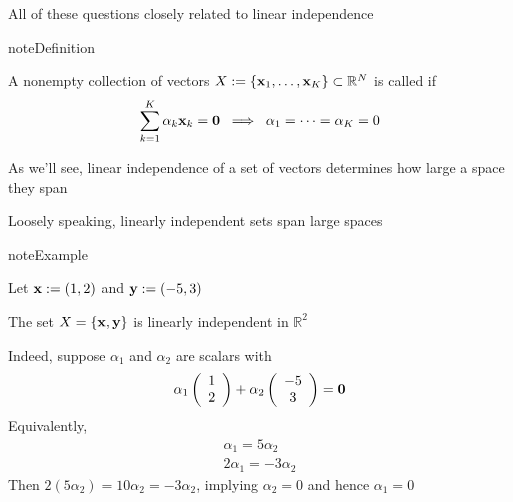 \documentclass[letterpaper,10pt,english]{jupyterBook}
\begin{document}
\sphinxAtStartPar
All of these questions closely related to linear independence

\begin{sphinxadmonition}{note}{Definition}

\sphinxAtStartPar
A nonempty collection of vectors \(X := \{{\bf x}_1,\ldots, {\bf x}_K\}
\subset \mathbb{R}^N\) is called  if
\begin{equation*}
\begin{split}
%
\sum_{k=1}^K \alpha_k {\bf x}_k
= {\bf 0} 
\; \implies \;
\alpha_1 = \cdots = \alpha_K = 0
%
\end{split}
\end{equation*}\end{sphinxadmonition}

\sphinxAtStartPar
As we’ll see, linear independence of a set of vectors determines how large
a space they span

\sphinxAtStartPar
Loosely speaking, linearly independent sets span large spaces

\begin{sphinxadmonition}{note}{Example}

\sphinxAtStartPar
Let \({\bf x} := (1, 2)\) and \({\bf y} := (-5, 3)\)

\sphinxAtStartPar
The set \(X = \{{\bf x}, {\bf y}\}\) is linearly independent in \(\mathbb{R}^2\)

\sphinxAtStartPar
Indeed, suppose \(\alpha_1\) and \(\alpha_2\) are scalars with
\begin{equation*}
\begin{split}
%
\alpha_1
\left(
\begin{array}{c}
1 \\
2
\end{array}
\right)
+ 
\alpha_2
\left(
\begin{array}{c}
-5 \\
3
\end{array}
\right)
=
{\bf 0}
%
\end{split}
\end{equation*}
\sphinxAtStartPar
Equivalently,
\begin{equation*}
\begin{split}
%
\alpha_1 = 5 \alpha_2
\\
2 \alpha_1 = -3 \alpha_2
%
\end{split}
\end{equation*}
\sphinxAtStartPar
Then \(2(5\alpha_2) = 10 \alpha_2 = -3 \alpha_2\), implying \(\alpha_2 = 0\)
and hence \(\alpha_1 = 0\)
\end{sphinxadmonition}
\end{document}
